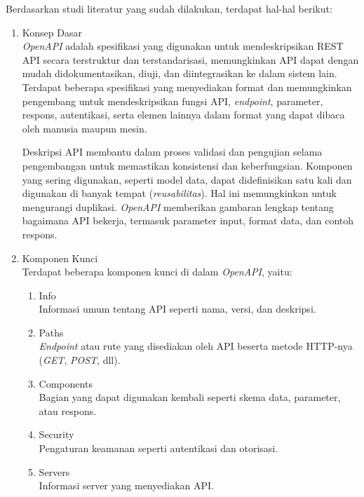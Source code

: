 Berdasarkan studi literatur yang sudah dilakukan, terdapat hal-hal berikut:
\begin{enumerate}[label*=\arabic*.,ref=\arabic*]
    \item Konsep Dasar \\
    \textit{OpenAPI} adalah spesifikasi yang digunakan untuk mendeskripsikan REST API secara terstruktur dan terstandarisasi, memungkinkan API dapat dengan mudah didokumentasikan, diuji, dan diintegrasikan ke dalam sistem lain. Terdapat beberapa spesifikasi yang menyediakan format dan memungkinkan pengembang untuk mendeskripsikan fungsi API, \textit{endpoint}, parameter, respons, autentikasi, serta elemen lainnya dalam format yang dapat dibaca oleh manusia maupun mesin.

    Deskripsi API membantu dalam proses validasi dan pengujian selama pengembangan untuk memastikan konsistensi dan keberfungsian. Komponen yang sering digunakan, seperti model data, dapat didefinisikan satu kali dan digunakan di banyak tempat (\textit{reusabilitas}). Hal ini memungkinkan untuk mengurangi duplikasi. \textit{OpenAPI} memberikan gambaran lengkap tentang bagaimana API bekerja, termasuk parameter input, format data, dan contoh respons.

    \item Komponen Kunci \\
    Terdapat beberapa komponen kunci di dalam \textit{OpenAPI}, yaitu:
    \begin{enumerate}[label=\alph*.]
        \item Info \\
        Informasi umum tentang API seperti nama, versi, dan deskripsi.
        \item Paths \\
        \textit{Endpoint} atau rute yang disediakan oleh API beserta metode HTTP-nya (\textit{GET}, \textit{POST}, dll).
        \item Components \\
        Bagian yang dapat digunakan kembali seperti skema data, parameter, atau respons.
        \item Security \\
        Pengaturan keamanan seperti autentikasi dan otorisasi.
        \item Servers \\
        Informasi server yang menyediakan API.
    \end{enumerate}
\end{enumerate}
